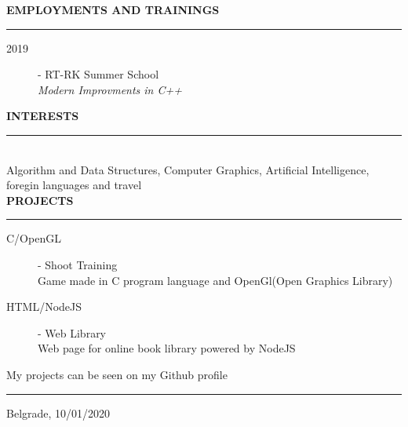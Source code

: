 \documentclass{article}
\begin{document}
\textbf{\large EMPLOYMENTS AND TRAININGS}\\
\color{my_col}\noindent\rule{15.4cm}{0.6pt}\color{black}
\begin{description}
    \item[ 2019] - RT-RK Summer School \\
    \textit{Modern Improvments in C++}
   
\end{description}

\textbf{\large INTERESTS}\\
\color{my_col}\noindent\rule{15.4cm}{0.6pt}\color{black}\\
Algorithm and Data Structures, Computer Graphics, Artificial Intelligence, foregin languages and travel\\

\textbf{\large PROJECTS}\\
\color{my_col}\noindent\rule{15.4cm}{0.6pt}\color{black}
\begin{description}
    \item[ C/OpenGL] - Shoot Training\\ 
    Game made in C program language and OpenGl(Open Graphics Library)
    \item[ HTML/NodeJS] - Web Library\\ 
    Web page for online book library powered by NodeJS
\end{description}
My projects can be seen on my Github profile \\

\color{my_col}\noindent\rule{15.4cm}{0.6pt}\color{black}
\begin{flushright}
	\small Belgrade, 10/01/2020
\end{flushright}
\end{document}
